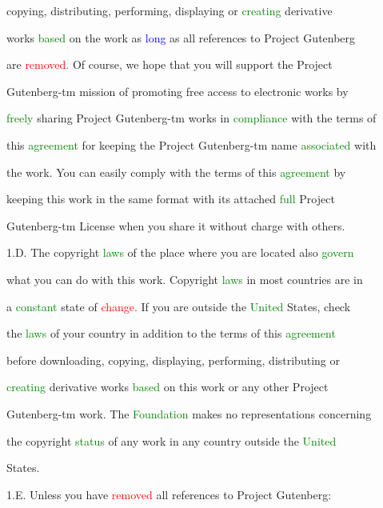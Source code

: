  copying, distributing, performing, displaying or \textcolor{green}{creating} derivative

 works \textcolor{green}{based} on the work as \textcolor{blue}{long} as all references to Project Gutenberg

 are \textcolor{red}{removed.} Of course, we \textcolor{BurntOrange}{hope} that you will support the Project

 Gutenberg-tm mission of promoting free access to electronic works by

 \textcolor{green}{freely} \textcolor{BurntOrange}{sharing} Project Gutenberg-tm works in \textcolor{green}{compliance} with the terms of

 this \textcolor{green}{agreement} for keeping the Project Gutenberg-tm name \textcolor{green}{associated} with

 the work. You can easily comply with the terms of this \textcolor{green}{agreement} by

 keeping this work in the same format with its attached \textcolor{green}{full} Project

 Gutenberg-tm License when you \textcolor{BurntOrange}{share} it without charge with others.



 1.D. The copyright \textcolor{green}{laws} of the place where you are located also \textcolor{green}{govern}

 what you can do with this work. Copyright \textcolor{green}{laws} in most countries are in

 a \textcolor{green}{constant} state of \textcolor{red}{change.} If you are outside the \textcolor{green}{United} States, check

 the \textcolor{green}{laws} of your country in addition to the terms of this \textcolor{green}{agreement}

 before downloading, copying, displaying, performing, distributing or

 \textcolor{green}{creating} derivative works \textcolor{green}{based} on this work or any other Project

 Gutenberg-tm work. The \textcolor{green}{Foundation} makes no representations concerning

 the copyright \textcolor{green}{status} of any work in any country outside the \textcolor{green}{United}

 States.



 1.E. Unless you have \textcolor{red}{removed} all references to Project Gutenberg:



